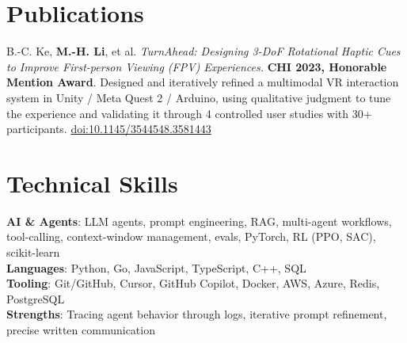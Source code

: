 \documentclass[letterpaper,11pt]{article}
\begin{document}
\section{Publications}
\small B.-C. Ke, \textbf{M.-H. Li}, et al. \textit{TurnAhead: Designing 3-DoF Rotational Haptic Cues to Improve First-person Viewing (FPV) Experiences.} \textbf{CHI 2023, Honorable Mention Award}. Designed and iteratively refined a multimodal VR interaction system in Unity / Meta Quest 2 / Arduino, using qualitative judgment to tune the experience and validating it through 4 controlled user studies with 30+ participants. \href{https://dl.acm.org/doi/10.1145/3544548.3581443}{doi:10.1145/3544548.3581443}

\section{Technical Skills}
 \begin{itemize}[leftmargin=0.15in, label={}]
    \small{\item{
\textbf{AI \& Agents}{: LLM agents, prompt engineering, RAG, multi-agent workflows, tool-calling, context-window management, evals, PyTorch, RL (PPO, SAC), scikit-learn} \\
\textbf{Languages}{: Python, Go, JavaScript, TypeScript, C++, SQL} \\
\textbf{Tooling}{: Git/GitHub, Cursor, GitHub Copilot, Docker, AWS, Azure, Redis, PostgreSQL} \\
\textbf{Strengths}{: Tracing agent behavior through logs, iterative prompt refinement, precise written communication}
    }}
 \end{itemize}
\end{document}
